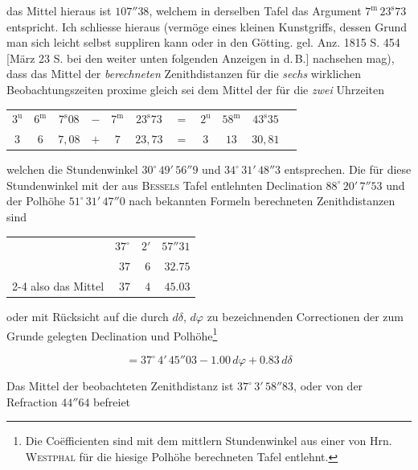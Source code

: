 \noindent das Mittel hieraus ist $107''38$, welchem in derselben Tafel das Argument $7^{\mathrm m}\,23^{\mathrm s}73$ entspricht. Ich schliesse hieraus (vermöge eines kleinen Kunstgriffs, dessen Grund man sich leicht selbst suppliren kann oder in den Götting. gel. Anz. 1815 S. 454 [März 23 S. bei den weiter unten folgenden Anzeigen in d.\,B.]  nachsehen mag), dass das Mittel der \emph{berechneten} Zenithdistanzen für die \emph{sechs} wirklichen Beobachtungszeiten proxime gleich sei dem Mittel der für die \emph{zwei} Uhrzeiten

\begin{center}\fontsize{9}{11}\selectfont\setlength{\tabcolsep}{3pt}\begin{tabular}{ccccccccccc}
$3^{\mathrm u}$ & $6^{\mathrm m}$ & $7^{\mathrm s}08$ & $-$ & $7^{\mathrm m}$ & $23^{\mathrm s}73$ & $=$ & $2^{\mathrm u}$ & $58^{\mathrm m}$ & $43^{\mathrm s}35$\\
$3$ & $6$ & $7{,}08$ & $+$ & $7$ & $23{,}73$ & $=$ & $3$ & $13$ & $30{,}81$\\
\end{tabular}\end{center}

\noindent welchen die Stundenwinkel $30^\circ\,49'\,56''9$ und $34^\circ\,31'\,48''3$ entsprechen. Die für diese Stundenwinkel mit der aus \textsc{Bessels} Tafel entlehnten Declination $88^\circ\,20'\,7''53$ und der Polhöhe $51^\circ\,31'\,47''0$ nach bekannten Formeln berechneten Zenithdistanzen sind

\begin{center}\fontsize{10}{12}\selectfont\begin{tabular}{lrrr}
& $37^\circ$ & $2'$ & $57''31$\\
& $37$ & $6$ & $32.75$\\\cline{2-4}
also das Mittel & $37$ & $4$ & $45.03$\\
\end{tabular}\end{center}
\noindent oder mit Rücksicht auf die durch $d\delta$, $d\varphi$ zu bezeichnenden Correctionen der zum Grunde gelegten Declination und Polhöhe\footnote{Die Coëfficienten sind mit dem mittlern Stundenwinkel aus einer von Hrn. \textsc{Westphal} für die hiesige Polhöhe berechneten Tafel entlehnt.}

\[ = 37^\circ\,4'\,45''03 - 1.00\,d\varphi + 0.83\,d\delta \]

\par\indent Das Mittel der beobachteten Zenithdistanz ist $37^\circ\,3'\,58''83$, oder von der Refraction $44''64$ befreiet

